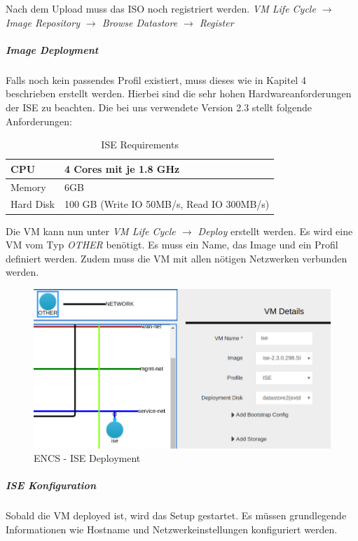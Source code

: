 Nach dem Upload muss das ISO noch registriert werden. \textit{VM Life Cycle $\rightarrow$ Image Repository $\rightarrow$ Browse Datastore $\rightarrow$ Register}

\subparagraph{Image Deployment}

Falls noch kein passendes Profil existiert, muss dieses wie in Kapitel 4 beschrieben erstellt werden. Hierbei sind die sehr hohen Hardwareanforderungen der ISE zu beachten. Die bei uns verwendete Version 2.3 stellt folgende Anforderungen:

\begin{table}[H]
	\centering
	\begin{tabularx}{\textwidth}{l | X}
		CPU & 4 Cores mit je 1.8 GHz        \\
		\hline
		Memory & 6GB \\
		\hline
		Hard Disk & 100 GB (Write IO 50MB/s, Read IO 300MB/s) \\
	\end{tabularx}
	\caption{ISE Requirements}
	\label{tab:ISE Requirements}
\end{table}

Die VM kann nun unter \textit{VM Life Cycle $\rightarrow$ Deploy} erstellt werden. Es wird eine VM vom Typ \textit{OTHER} benötigt. Es muss ein Name, das Image und ein Profil definiert werden. Zudem muss die VM mit allen nötigen Netzwerken verbunden werden.

\begin{figure}[H]
	\centering
	\includegraphics[width=0.8\linewidth]{img/Absicherung/ENCS-ISE-Deployment.png}
	\caption{ENCS - ISE Deployment}
	\label{fig:ENCS - ISE Deployment}
\end{figure}

\subparagraph{ISE Konfiguration}

Sobald die VM deployed ist, wird das Setup gestartet. Es müssen grundlegende Informationen wie Hostname und Netzwerkeinstellungen konfiguriert werden.  

